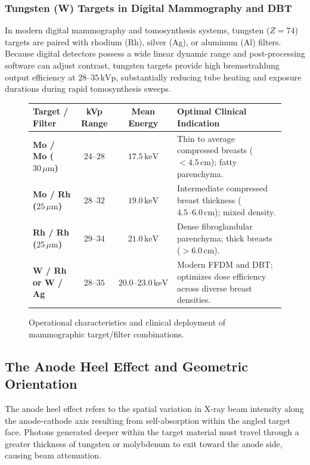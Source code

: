 \documentclass[11pt,a4paper]{article}
\begin{document}
\subsubsection{Tungsten (W) Targets in Digital Mammography and DBT}
In modern digital mammography and tomosynthesis systems, tungsten ($Z = 74$) targets are paired with rhodium (Rh), silver (Ag), or aluminum (Al) filters. Because digital detectors possess a wide linear dynamic range and post-processing software can adjust contrast, tungsten targets provide high bremsstrahlung output efficiency at $28\text{--}35\,\text{kVp}$, substantially reducing tube heating and exposure durations during rapid tomosynthesis sweeps.

\begin{figure}[htbp]
\centering
\setlength{\tabcolsep}{4pt}
\begin{tabular}{lccp{6.5cm}}
\toprule
\textbf{Target / Filter} & \textbf{kVp Range} & \textbf{Mean Energy} & \textbf{Optimal Clinical Indication} \\
\midrule
\textbf{Mo / Mo ($30\,\mu\text{m}$)} & $24\text{--}28$ & $17.5\,\text{keV}$ & Thin to average compressed breasts ($< 4.5\,\text{cm}$); fatty parenchyma. \\
\addlinespace
\textbf{Mo / Rh ($25\,\mu\text{m}$)} & $28\text{--}32$ & $19.0\,\text{keV}$ & Intermediate compressed breast thickness ($4.5\text{--}6.0\,\text{cm}$); mixed density. \\
\addlinespace
\textbf{Rh / Rh ($25\,\mu\text{m}$)} & $29\text{--}34$ & $21.0\,\text{keV}$ & Dense fibroglandular parenchyma; thick breasts ($> 6.0\,\text{cm}$). \\
\addlinespace
\textbf{W / Rh or W / Ag} & $28\text{--}35$ & $20.0\text{--}23.0\,\text{keV}$ & Modern FFDM and DBT; optimizes dose efficiency across diverse breast densities. \\
\bottomrule
\end{tabular}
\caption{Operational characteristics and clinical deployment of mammographic target/filter combinations.}
\label{tab:target_filter}
\end{figure}

\subsection{The Anode Heel Effect and Geometric Orientation}

The anode heel effect refers to the spatial variation in X-ray beam intensity along the anode-cathode axis resulting from self-absorption within the angled target face. Photons generated deeper within the target material must travel through a greater thickness of tungsten or molybdenum to exit toward the anode side, causing beam attenuation.
\end{document}
